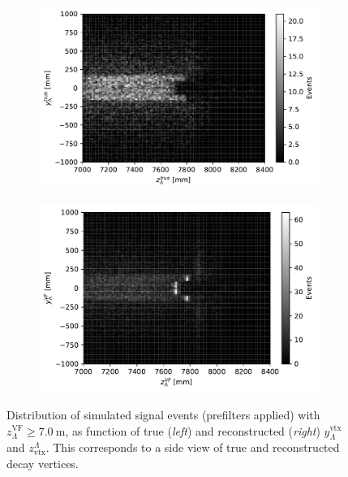 \begin{figure}[t]
	\centering
	\begin{subfigure}{.45\textwidth}
		\includegraphics[width=\textwidth]{graphics/04-event_selection/Lambda_endvertex_z_vs_y_true.pdf}
		\caption{}
	\end{subfigure}
	\begin{subfigure}{.45\textwidth}
		\includegraphics[width=\textwidth]{graphics/04-event_selection/Lambda_endvertex_z_vs_y.pdf}
		\caption{}
	\end{subfigure}
	\caption{Distribution of simulated \demonstratorshort signal events (prefilters applied) with $z_\Lambda^\text{VF} \geq \SI{7.0}{\meter}$, as function of true (\textit{left}) and reconstructed (\textit{right}) $y_\Lambda^\text{vtx}$ and $z_\text{vtx}^\Lambda$. This corresponds to a side view of true and reconstructed \lz decay vertices.}
\end{figure}

